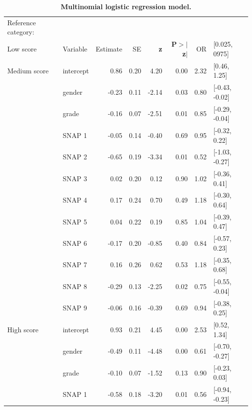 \documentclass[10pt,letterpaper]{article}
\begin{document}
{{%
\begin{table}[H]
\centering
\caption{\bf Multinomial logistic regression model.} 
\begin{tabular}{|llrrrr|rl}
  \hline
Reference category: &&&&&&&\\
Low score & Variable &Estimate & SE & \textbf{z} & \textbf{P$>$$|$z$|$} &  OR &  [0.025, 0975]\\ 
 \hline
  \hline
Medium score & intercept  & 0.86 & 0.20 & 4.20 & 0.00 & 2.32 &  [0.46, 1.25] \\ 
\hline
  & gender & -0.23 & 0.11 & -2.14 & 0.03 & 0.80 & [-0.43, -0.02] \\ 
 \hline
  & grade & -0.16 & 0.07 & -2.51 & 0.01& 0.85 &  [-0.29, -0.04] \\ 
 \hline
  & SNAP 1 & -0.05 & 0.14 & -0.40 & 0.69 & 0.95 & [-0.32, 0.22] \\ 
  \hline
  & SNAP 2 & -0.65 & 0.19 & -3.34 & 0.01 & 0.52 & [-1.03, -0.27] \\ 
  \hline
  & SNAP 3 & 0.02 & 0.20 & 0.12 & 0.90 & 1.02 & [-0.36, 0.41] \\ 
  \hline
  & SNAP 4 & 0.17 & 0.24 & 0.70 & 0.49 & 1.18 & [-0.30, 0.64] \\ 
  \hline
  & SNAP 5 & 0.04 & 0.22 & 0.19 & 0.85 & 1.04 &[-0.39, 0.47]\\ 
  \hline
  & SNAP 6 & -0.17 & 0.20 & -0.85 & 0.40 &  0.84 & [-0.57, 0.23] \\ 
   \hline
  & SNAP 7 & 0.16 & 0.26 & 0.62 & 0.53 & 1.18 & [-0.35, 0.68] \\ 
  \hline
  & SNAP 8 & -0.29 & 0.13 & -2.25 & 0.02 & 0.75 & [-0.55, -0.04] \\ 
  \hline
  & SNAP 9 & -0.06 & 0.16 & -0.39 & 0.69 & 0.94 & [-0.38, 0.25] \\ 
   \hline
   \hline
   High score & intercept & 0.93 & 0.21 & 4.45 & 0.00 & 2.53 & [0.52, 1.34] \\ 
  \hline
  & gender & -0.49 & 0.11 & -4.48 & 0.00 & 0.61 & [-0.70, -0.27] \\ 
 \hline
 & grade & -0.10 & 0.07 & -1.52 & 0.13 & 0.90 & [-0.23, 0.03] \\ 
 \hline
  & SNAP 1 & -0.58 & 0.18 & -3.20 & 0.01 & 0.56 & [-0.94, -0.23] \\ 

\end{tabular}
\end{table}}}
\end{document}
